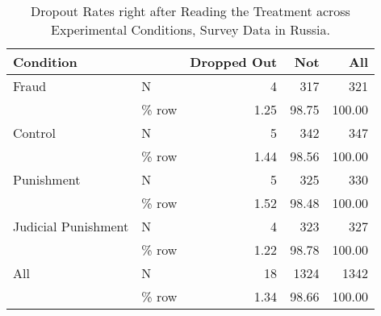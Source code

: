 \begin{table}

\caption{Dropout Rates right after Reading the Treatment across Experimental Conditions,
Survey Data in Russia.}
\centering
\begin{tabular}[t]{llrrr}
\toprule
Condition &   & Dropped Out & Not & All\\
\midrule
Fraud & N & 4 & 317 & 321\\
 & \% row & \num{1.25} & \num{98.75} & \num{100.00}\\
Control & N & 5 & 342 & 347\\
 & \% row & \num{1.44} & \num{98.56} & \num{100.00}\\
Punishment & N & 5 & 325 & 330\\
 & \% row & \num{1.52} & \num{98.48} & \num{100.00}\\
Judicial Punishment & N & 4 & 323 & 327\\
 & \% row & \num{1.22} & \num{98.78} & \num{100.00}\\
All & N & 18 & 1324 & 1342\\
 & \% row & \num{1.34} & \num{98.66} & \num{100.00}\\
\bottomrule
\end{tabular}
\end{table}
